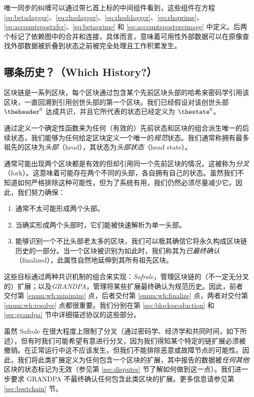 唯一同步的纠缠可以通过带匕首上标的中间组件看到，这些组件在方程 \ref{eq:betadagger}、\ref{eq:rhodagger}、\ref{eq:rhoddagger}、\ref{eq:rhoprime}、\ref{eq:accountspostxfer}、\ref{eq:betaprime} 和 \ref{eq:accountspostpreimage} 中定义。后两个标记了依赖图中的合并和连接，具体而言，意味着可用性外部数据可以在原像查找外部数据被折叠到状态之前被完全处理且工作积累发生。

\subsection{哪条历史？（Which History?）}

区块链是一系列区块，每个区块通过包含某个先前区块头部的哈希来密码学引用该区块，一直回溯到引用创世头部的第一个区块。我们已经假设对该创世头部 $\theheader^0$ 达成共识，并且它所代表的状态已经定义为 $\thestate^0$。

通过定义一个确定性函数来为任何（有效的）先前状态和区块的组合派生唯一的后续状态，我们能够为任何给定区块定义一个唯一的\emph{规范}状态。我们通常称拥有最多祖先的区块为\emph{头部}（head），其状态为\emph{头部状态}（head state）。

通常可能出现两个区块都是有效的但却引用同一个先前区块的情况，这被称为\emph{分叉}（fork）。这意味着可能存在两个不同的头部，各自拥有自己的状态。虽然我们不知道如何严格排除这种可能性，但为了系统有用，我们仍然必须尽量减少它。因此，我们努力确保：

\begin{enumerate}
  \item\label{enum:wh:minimize} 通常不太可能形成两个头部。
  \item\label{enum:wh:resolve} 当确实形成两个头部时，它们能被快速解析为单一头部。
  \item\label{enum:wh:finalize} 能够识别一个不比头部老太多的区块，我们可以极其确信它将永久构成区块链历史的一部分。当一个区块被识别为如此时，我们称其为\emph{已最终确认}（finalized），此属性自然地延伸到其所有祖先区块。
\end{enumerate}

这些目标通过两种共识机制的组合来实现：\emph{Safrole}，管理区块链的（不一定无分叉的）扩展；以及\emph{GRANDPA}，管理将某些扩展最终确认为规范历史。因此，前者交付第 \ref{enum:wh:minimize} 点，后者交付第 \ref{enum:wh:finalize} 点，两者对交付第 \ref{enum:wh:resolve} 点都很重要。我们分别在第 \ref{sec:blockproduction} 和 \ref{sec:grandpa} 节中详细描述协议的这些部分。

虽然 Safrole 在很大程度上限制了分叉（通过密码学、经济学和共同时间，如下所述），但有时我们可能希望有意进行分叉，因为我们得知某个特定的链扩展必须被撤销。在正常运行中这不应该发生，但我们不能排除恶意或故障节点的可能性。因此，我们将此类扩展定义为任何包含一个区块的扩展，其中报告的数据被\emph{任何其他}区块的状态标记为无效（参见第 \ref{sec:disputes} 节了解如何做到这一点）。我们进一步要求 GRANDPA 不最终确认任何包含此类区块的扩展。更多信息请参见第 \ref{sec:bestchain} 节。

